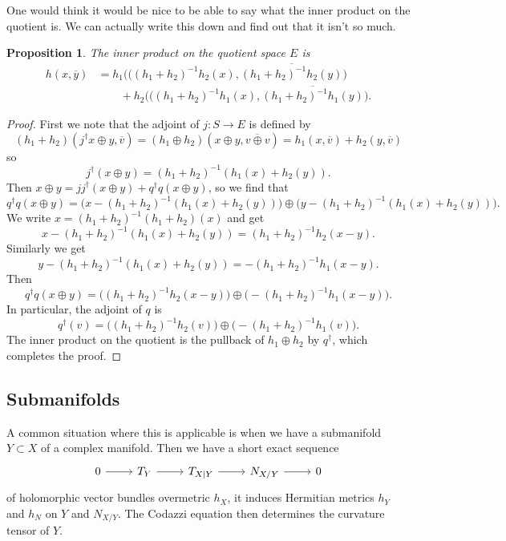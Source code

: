 \documentclass[10pt,a4paper]{article}
\newtheorem{prop}[theo]{Proposition}
\newtheorem*{proof}{Proof}
\def\ov#1{\overline{#1}}
\begin{document}
One would think it would be nice to be able to say what the inner product on the quotient is. We can actually write this down and find out that it isn't so much.

\begin{prop}
The inner product on the quotient space $E$ is
\begin{align*}
h(x, \ov y)
&=
h_1\bigl(((h_1+h_2)^{-1}h_2(x),
\ov{(h_1+h_2)^{-1}h_2(y)}\bigr)
\\
&\qquad
+ h_2\bigl(((h_1+h_2)^{-1}h_1(x),
\ov{(h_1+h_2)^{-1}h_1(y)}\bigr).
\end{align*}
\end{prop}

\begin{proof}
First we note that the adjoint of $j : S \to E$ is defined by
\[
(h_1 + h_2)(j^\dagger x \oplus y, \ov v)
= (h_1\oplus h_2)( x \oplus y, \ov{v \oplus v})
= h_1(x, \ov v) + h_2(y, \ov v)
\]
so
\[
j^\dagger(x \oplus y)
= (h_1+h_2)^{-1}(h_1(x) + h_2(y)).
\]
Then $x \oplus y = jj^\dagger (x\oplus y) + q^\dagger q(x \oplus y)$, so we find that
\[
q^\dagger q(x \oplus y)
= \bigl(
x - (h_1+h_2)^{-1}(h_1(x) + h_2(y))
\bigr) \oplus
\bigl(
y - (h_1+h_2)^{-1}(h_1(x) + h_2(y))
\bigr).
\]
We write $x = (h_1+h_2)^{-1}(h_1 + h_2)(x)$ and get
\[
x - (h_1+h_2)^{-1}(h_1(x) + h_2(y))
= (h_1+h_2)^{-1}h_2(x - y).
\]
Similarly we get
\[
y - (h_1+h_2)^{-1}(h_1(x) + h_2(y))
= -(h_1+h_2)^{-1}h_1(x - y).
\]
Then
\[
q^\dagger q(x \oplus y)
= \bigl(
(h_1+h_2)^{-1}h_2(x - y)
\bigr)
\oplus
\bigl(
-(h_1+h_2)^{-1}h_1(x - y)
\bigr).
\]
In particular, the adjoint of $q$ is
\[
q^\dagger(v)
=\bigl(
(h_1+h_2)^{-1}h_2(v)
\bigr)
\oplus
\bigl(
-(h_1+h_2)^{-1}h_1(v)
\bigr).
\]
The inner product on the quotient is the pullback of $h_1 \oplus h_2$ by $q^\dagger$, which completes the proof.
\end{proof}



\subsection{Submanifolds}

A common situation where this is applicable is when we have a submanifold $Y \subset X$ of a complex manifold. Then we have a short exact sequence
\[
\begin{tikzcd}
0 \arrow[r] & T_Y \arrow[r] & T_{X|Y} \arrow[r] & N_{X/Y} \arrow[r] & 0
\end{tikzcd}
\]
of holomorphic vector bundles overmetric $h_X$, it induces Hermitian metrics $h_Y$ and $h_{N}$ on $Y$ and $N_{X/Y}$. The Codazzi equation then determines the curvature tensor of $Y$.
\end{document}
